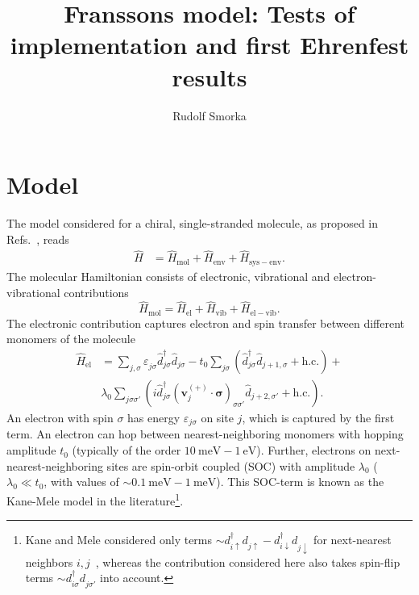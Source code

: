 \documentclass{article}
\renewcommand{\vec}[1]{\mathbf{#1}}
\newcommand{\pdagger}{{\phantom{\dagger}}}
\begin{document}
	
\title{Franssons model: Tests of implementation and first Ehrenfest results}
\author{Rudolf Smorka}
\maketitle
\tableofcontents
\section{Model}
The model considered for a chiral, single-stranded molecule, as proposed in Refs.~\cite{fransson2019chirality,fransson2020vibrational,Fransson_2021,fransson2021charge}, reads
\begin{align}
	\hat{H} &= \hat{H}_\mathrm{mol} + \hat{H}_\mathrm{env} + \hat{H}_\mathrm{sys-env}.
\end{align} 
The molecular Hamiltonian consists of electronic, vibrational and electron-vibrational contributions 
\begin{equation}
	\hat{H}_\mathrm{mol} = \hat{H}_\mathrm{el}  + \hat{H}_\mathrm{vib} + \hat{H}_\mathrm{el-vib}.
\end{equation}
The electronic contribution captures electron and spin transfer between different monomers of the molecule
\begin{equation}
			\begin{split}
			\hat{H}_\mathrm{el} &= \sum_{j,\sigma} \varepsilon_{j\sigma}^\pdagger \hat{d}_{j\sigma}^\dagger \hat{d}_{j\sigma}^\pdagger - t_0 \sum_{j\sigma} (\hat{d}_{j\sigma}^\dagger \hat{d}_{j+1,\sigma}^\pdagger + \mathrm{h.c.}) +\\& \lambda_0^\pdagger\sum_{j\sigma\sigma'} (i\hat{d}_{j\sigma}^\dagger (\vec{v}_j^{(+)}\cdot \bm{\sigma})_{\sigma\sigma'}^\pdagger \hat{d}_{j+2,\sigma'}^\pdagger + \mathrm{h.c.}).
		\end{split}
\end{equation}
An electron with spin $\sigma$ has energy $\varepsilon_{j\sigma}$ on site $j$, which is captured by the first term. An electron can hop between nearest-neighboring monomers with hopping amplitude $t_0$ (typically of the order $\SI{10}{\milli\electronvolt}-\SI{1}{\electronvolt}$). Further, electrons on next-nearest-neighboring sites are spin-orbit coupled (SOC) with amplitude $\lambda_0$ ($\lambda_0 \ll t_0$, with values of $\sim \SI{0.1}{\milli\electronvolt}-\SI{1}{\milli\electronvolt}$). This SOC-term is known as the  Kane-Mele model in the literature\footnote{Kane and Mele considered only terms $\sim d_{i\uparrow}^\dagger d_{j\uparrow}^\pdagger - d_{i\downarrow}^\dagger d_{j\downarrow}^\pdagger$ for next-nearest neighbors $i,j$~\cite{kane2005quantum}, whereas the contribution considered here also takes spin-flip terms $\sim d_{i\sigma}^\dagger d_{j\sigma'}^\pdagger$ into account.}.
\end{document}
